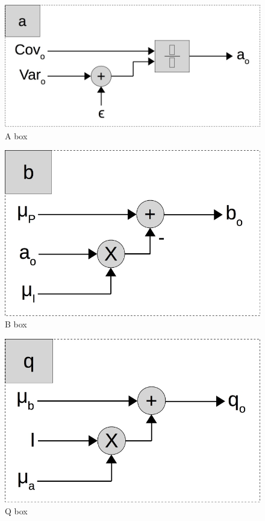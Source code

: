 \begin{figure}[ht!]
  \centering
  \includegraphics[scale=0.3]{figures/a_par}
  \caption{A box}
  \label{fig:a_par}
\end{figure}

\begin{figure}[ht!]
  \centering
  \includegraphics[scale=0.3]{figures/b_par}
  \caption{B box}
  \label{fig:b_par}
\end{figure}

\begin{figure}[ht!]
  \centering
  \includegraphics[scale=0.3]{figures/q_par}
  \caption{Q box}
  \label{fig:q_par}
\end{figure}

